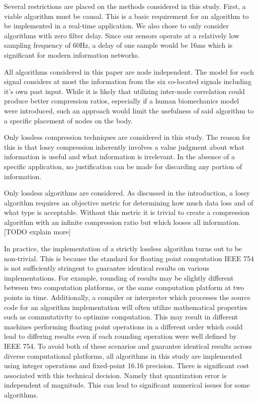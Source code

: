 \documentclass[journal]{IEEEtran}
\begin{document}
Several restrictions are placed on the methods considered in this study. First, a viable algorithm must be causal. This is a basic requirement for an algorithm to be implemented in a real-time application. We also chose to only consider algorithms with zero filter delay. Since our sensors operate at a relatively low sampling frequency of 60Hz, a delay of one sample would be 16ms which is significant for modern information networks.

All algorithms considered in this paper are node independent. The model for each signal considers at most the information from the six co-located signals including it's own past input. While it is likely that utilizing inter-node correlation could produce better compression ratios, especially if a human biomechanics model were introduced, such an approach would limit the usefulness of said algorithm to a specific placement of nodes on the body.

Only lossless compression techniques are considered in this study. The reason for this is that lossy compression inherently involves a value judgment about what information is useful and what information is irrelevant. In the absence of a specific application, no justification can be made for discarding any portion of information.

Only lossless algorithms are considered. As discussed in the introduction, a lossy algorithm requires an objective metric for determining how much data loss and of what type is acceptable. Without this metric it is trivial to create a compression algorithm with an infinite compression ratio but which looses all information. [TODO explain more]

In practice, the implementation of a strictly lossless algorithm turns out to be non-trivial. This is because the standard for floating point computation IEEE 754 \cite{Society2008} is not sufficiently stringent to guarantee identical results on various implementations. For example, rounding of results may be slightly different between two computation platforms, or the same computation platform at two points in time. Additionally, a compiler or interpreter which processes the source code for an algorithm implementation will often utilize mathematical properties such as commutativity to optimize computation. This may result in different machines performing floating point operations in a different order which could lead to differing results even if each rounding operation were well defined by IEEE 754. To avoid both of these scenarios and guarantee identical results across diverse computational platforms, all algorithms in this study are implemented using integer operations and fixed-point 16.16 precision. There is significant cost associated with this technical decision. Namely that quantization error is independent of magnitude. This can lead to significant numerical issues for some algorithms.
\end{document}
